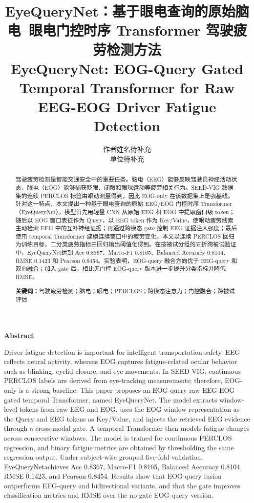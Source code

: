 \documentclass[UTF8,a4paper,10pt,fontset=windows]{ctexart}
\title{\textbf{EyeQueryNet：基于眼电查询的原始脑电--眼电门控时序 Transformer 驾驶疲劳检测方法}\\[3pt]
\large EyeQueryNet: EOG-Query Gated Temporal Transformer for Raw EEG-EOG Driver Fatigue Detection}
\author{作者姓名待补充\\单位待补充}
\date{}
\newcommand{\method}{EyeQueryNet}
\begin{document}
\maketitle

\begin{abstract}
驾驶疲劳检测是智能交通安全中的重要任务。脑电（EEG）能够反映驾驶员神经活动状态，眼电（EOG）能够捕获眨眼、闭眼和眼球运动等疲劳相关行为。SEED-VIG 数据集的连续 PERCLOS 标签由眼动测量得到，因此 EOG-only 在该数据集上是强基线。针对这一特点，本文提出一种基于眼电查询的原始 EEG/EOG 门控时序 Transformer（\method）。模型首先用轻量 CNN 从原始 EEG 和 EOG 中提取窗口级 token；随后以 EOG 窗口表征作为 Query，以 EEG token 作为 Key/Value，使眼动疲劳线索主动检索 EEG 中的互补神经证据；再通过跨模态 gate 控制 EEG 证据注入强度；最后使用 temporal Transformer 建模连续窗口中的疲劳变化。本文以连续 PERCLOS 回归为训练目标，二分类疲劳指标由回归输出阈值化得到。在按被试分组的五折跨被试验证中，\method 达到 Acc 0.8367、Macro-F1 0.8165、Balanced Accuracy 0.8104、RMSE 0.1423 和 Pearson 0.8454。实验表明，EOG-query 融合方向优于 EEG-query 和双向融合；加入 gate 后，相比无门控 EOG-query 版本进一步提升分类指标并降低 RMSE。

\noindent\textbf{关键词：}驾驶疲劳检测；脑电；眼电；PERCLOS；跨模态注意力；门控融合；跨被试评估
\end{abstract}

\begin{center}
\textbf{Abstract}
\end{center}
\noindent Driver fatigue detection is important for intelligent transportation safety. EEG reflects neural activity, whereas EOG captures fatigue-related ocular behavior such as blinking, eyelid closure, and eye movements. In SEED-VIG, continuous PERCLOS labels are derived from eye-tracking measurements; therefore, EOG-only is a strong baseline. This paper proposes an EOG-query raw EEG-EOG gated temporal Transformer, named \method. The model extracts window-level tokens from raw EEG and EOG, uses the EOG window representation as the Query and EEG tokens as Key/Value, and injects the retrieved EEG evidence through a cross-modal gate. A temporal Transformer then models fatigue changes across consecutive windows. The model is trained for continuous PERCLOS regression, and binary fatigue metrics are obtained by thresholding the same regression output. Under subject-wise grouped five-fold validation, \method achieves Acc 0.8367, Macro-F1 0.8165, Balanced Accuracy 0.8104, RMSE 0.1423, and Pearson 0.8454. Results show that EOG-query fusion outperforms EEG-query and bidirectional variants, and that the gate improves classification metrics and RMSE over the no-gate EOG-query version.
\end{document}
